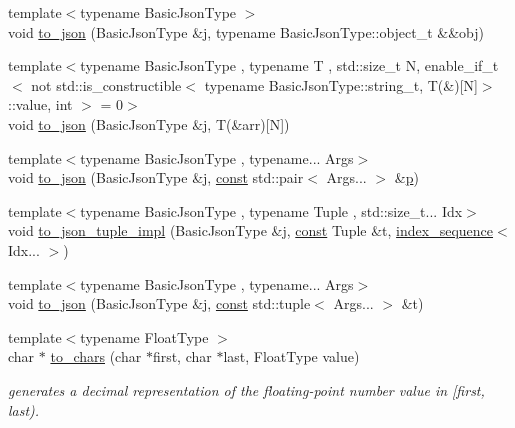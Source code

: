\begin{DoxyCompactItemize}
\item 
{\footnotesize template$<$typename Basic\+Json\+Type $>$ }\\void \hyperlink{namespacenlohmann_1_1detail_ac9f7a5542851c61d93740148eaec509f}{to\+\_\+json} (Basic\+Json\+Type \&j, typename Basic\+Json\+Type\+::object\+\_\+t \&\&obj)
\item 
{\footnotesize template$<$typename Basic\+Json\+Type , typename T , std\+::size\+\_\+t N, enable\+\_\+if\+\_\+t$<$ not std\+::is\+\_\+constructible$<$ typename Basic\+Json\+Type\+::string\+\_\+t, T(\&)\mbox{[}\+N\mbox{]}$>$\+::value, int $>$  = 0$>$ }\\void \hyperlink{namespacenlohmann_1_1detail_a8c4d301fc51996e3c5c1257fb92ace20}{to\+\_\+json} (Basic\+Json\+Type \&j, T(\&arr)\mbox{[}N\mbox{]})
\item 
{\footnotesize template$<$typename Basic\+Json\+Type , typename... Args$>$ }\\void \hyperlink{namespacenlohmann_1_1detail_aa30611f74062379d3420c40487cf3bb3}{to\+\_\+json} (Basic\+Json\+Type \&j, \hyperlink{functions__c_8js_afacfd9c985d225bb07483b887a801b6f}{const} std\+::pair$<$ Args... $>$ \&\hyperlink{jquery_8js_a2335e57f79b6acfb6de59c235dc8a83e}{p})
\item 
{\footnotesize template$<$typename Basic\+Json\+Type , typename Tuple , std\+::size\+\_\+t... Idx$>$ }\\void \hyperlink{namespacenlohmann_1_1detail_a510dfa15b01e9a8afe31600a27b28199}{to\+\_\+json\+\_\+tuple\+\_\+impl} (Basic\+Json\+Type \&j, \hyperlink{functions__c_8js_afacfd9c985d225bb07483b887a801b6f}{const} Tuple \&t, \hyperlink{structnlohmann_1_1detail_1_1index__sequence}{index\+\_\+sequence}$<$ Idx... $>$)
\item 
{\footnotesize template$<$typename Basic\+Json\+Type , typename... Args$>$ }\\void \hyperlink{namespacenlohmann_1_1detail_aa7a47b08eee864c2c108c04954919648}{to\+\_\+json} (Basic\+Json\+Type \&j, \hyperlink{functions__c_8js_afacfd9c985d225bb07483b887a801b6f}{const} std\+::tuple$<$ Args... $>$ \&t)
\item 
{\footnotesize template$<$typename Float\+Type $>$ }\\char $\ast$ \hyperlink{namespacenlohmann_1_1detail_a6192f1eab05fbbc5c35edb8368c8fc57}{to\+\_\+chars} (char $\ast$first, char $\ast$last, Float\+Type value)
\begin{DoxyCompactList}\small\item\em generates a decimal representation of the floating-\/point number value in \mbox{[}first, last). \end{DoxyCompactList}\end{DoxyCompactItemize}


